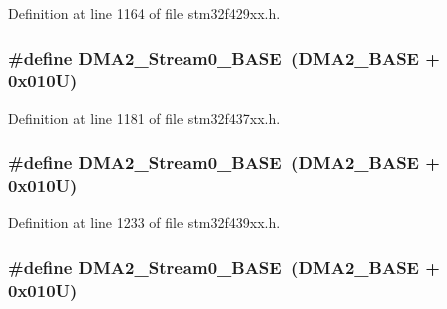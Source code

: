Definition at line 1164 of file stm32f429xx.\+h.

\subsubsection[{\texorpdfstring{D\+M\+A2\+\_\+\+Stream0\+\_\+\+B\+A\+SE}{DMA2_Stream0_BASE}}]{\setlength{\rightskip}{0pt plus 5cm}\#define D\+M\+A2\+\_\+\+Stream0\+\_\+\+B\+A\+SE~({\bf D\+M\+A2\+\_\+\+B\+A\+SE} + 0x010\+U)}\hypertarget{group___peripheral__memory__map_gac4c67b24726ba6b94d03adb351bcec4d}{}\label{group___peripheral__memory__map_gac4c67b24726ba6b94d03adb351bcec4d}


Definition at line 1181 of file stm32f437xx.\+h.

\subsubsection[{\texorpdfstring{D\+M\+A2\+\_\+\+Stream0\+\_\+\+B\+A\+SE}{DMA2_Stream0_BASE}}]{\setlength{\rightskip}{0pt plus 5cm}\#define D\+M\+A2\+\_\+\+Stream0\+\_\+\+B\+A\+SE~({\bf D\+M\+A2\+\_\+\+B\+A\+SE} + 0x010\+U)}\hypertarget{group___peripheral__memory__map_gac4c67b24726ba6b94d03adb351bcec4d}{}\label{group___peripheral__memory__map_gac4c67b24726ba6b94d03adb351bcec4d}


Definition at line 1233 of file stm32f439xx.\+h.

\subsubsection[{\texorpdfstring{D\+M\+A2\+\_\+\+Stream0\+\_\+\+B\+A\+SE}{DMA2_Stream0_BASE}}]{\setlength{\rightskip}{0pt plus 5cm}\#define D\+M\+A2\+\_\+\+Stream0\+\_\+\+B\+A\+SE~({\bf D\+M\+A2\+\_\+\+B\+A\+SE} + 0x010\+U)}\hypertarget{group___peripheral__memory__map_gac4c67b24726ba6b94d03adb351bcec4d}{}\label{group___peripheral__memory__map_gac4c67b24726ba6b94d03adb351bcec4d}


